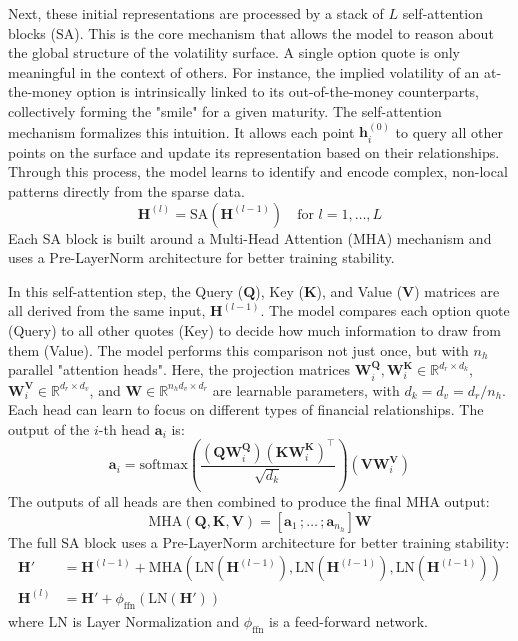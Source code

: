 \documentclass[authoryear,preprint,review,12pt]{elsarticle}
\begin{document}
Next, these initial representations are processed by a stack of \(L\) self-attention blocks (\(\text{SA}\)). This is the core mechanism that allows the model to reason about the global structure of the volatility surface. A single option quote is only meaningful in the context of others. For instance, the implied volatility of an at-the-money option is intrinsically linked to its out-of-the-money counterparts, collectively forming the "smile" for a given maturity. The self-attention mechanism formalizes this intuition. It allows each point \(\mathbf{h}_i^{(0)}\) to query all other points on the surface and update its representation based on their relationships. Through this process, the model learns to identify and encode complex, non-local patterns directly from the sparse data.
\begin{equation}
    \mathbf{H}^{(l)} = \text{SA}(\mathbf{H}^{(l-1)}) \quad \text{for } l = 1, \dots, L
    \label{eq:contextualization}
\end{equation}
Each SA block is built around a Multi-Head Attention (MHA) mechanism \citep{vaswani2017attention} and uses a Pre-LayerNorm architecture \citep{xiong2020layer} for better training stability. 

In this self-attention step, the Query (\(\mathbf{Q}\)), Key (\(\mathbf{K}\)), and Value (\(\mathbf{V}\)) matrices are all derived from the same input, \(\mathbf{H}^{(l-1)}\). The model compares each option quote (Query) to all other quotes (Key) to decide how much information to draw from them (Value). The model performs this comparison not just once, but with \(n_h\) parallel "attention heads". Here, the projection matrices \(\mathbf{W}_i^\mathbf{Q}, \mathbf{W}_i^\mathbf{K} \in \mathbb{R}^{d_r \times d_k}\), \(\mathbf{W}_i^\mathbf{V} \in \mathbb{R}^{d_r \times d_v}\), and \(\mathbf{W} \in \mathbb{R}^{n_h d_v \times d_r}\) are learnable parameters, with \(d_k = d_v = d_r / n_h\). Each head can learn to focus on different types of financial relationships. The output of the $i$-th head \(\mathbf{a}_i\) is:
\begin{equation}
    \mathbf{a}_i = \text{softmax}\left(\frac{(\mathbf{Q}\mathbf{W}_i^\mathbf{Q})(\mathbf{K}\mathbf{W}_i^\mathbf{K})^\intercal}{\sqrt{d_k}}\right) (\mathbf{V}\mathbf{W}_i^\mathbf{V})
\end{equation}
The outputs of all heads are then combined to produce the final MHA output:
\begin{equation}
    \text{MHA}(\mathbf{Q},\mathbf{K}, \mathbf{V}) =[\mathbf{a}_1\, ; \dots\, ; \mathbf{a}_{n_h}] \mathbf{W}
\end{equation}
The full SA block uses a Pre-LayerNorm architecture for better training stability:
\begin{align}
    \mathbf{H}' &= \mathbf{H}^{(l-1)} + \text{MHA}(\text{LN}(\mathbf{H}^{(l-1)}), \text{LN}(\mathbf{H}^{(l-1)}), \text{LN}(\mathbf{H}^{(l-1)})) \\
    \mathbf{H}^{(l)} &= \mathbf{H}' + \phi_{\text{ffn}}(\text{LN}(\mathbf{H}'))
\end{align}
where \(\text{LN}\) is Layer Normalization and \(\phi_{\text{ffn}}\) is a feed-forward network.
\end{document}
